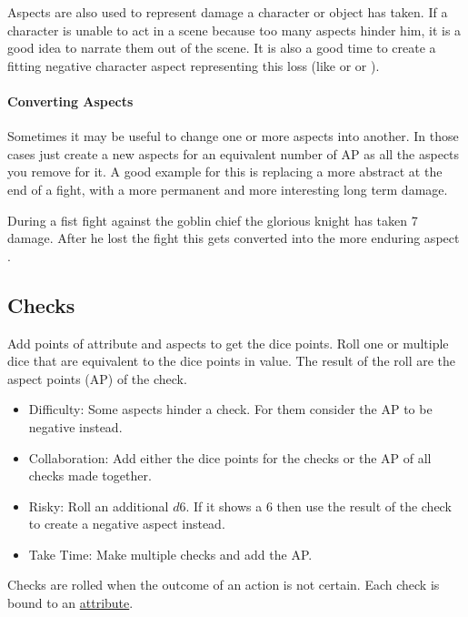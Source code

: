 \documentclass[11pt]{article}
\begin{document}
{Aspects are also used to represent damage a character or object has taken. If a character is unable to act in a scene because too many aspects hinder him, it is a good idea to narrate them out of the scene. It is also a good time to create a fitting negative character aspect representing this loss (like  or  or ).
\paragraph*{Converting Aspects}
\label{sec:org5ca254e}

Sometimes it may be useful to change one or more aspects into another. In those cases just create a new aspects for an equivalent number of AP as all the aspects you remove for it.
A good example for this is replacing a more abstract  at the end of a fight, with a more permanent and more interesting long term damage.

\begin{pwexample}
During a fist fight against the goblin chief the glorious knight has taken 7 damage. After he lost the fight this gets converted into the more enduring aspect . 
\end{pwexample}
\subsection{Checks}
\label{sec:org6abca6f}
\begin{short}
Add points of attribute and aspects to get the dice points. Roll one or multiple dice that are equivalent to the dice points in value. The result of the roll are the aspect points (AP) of the check.
\begin{itemize}
\item Difficulty: Some aspects hinder a check. For them consider the AP to be negative instead.
\item Collaboration: Add either the dice points for the checks or the AP of all checks made together.
\item Risky: Roll an additional \(d6\). If it shows a \(6\) then use the result of the check to create a negative aspect instead.
\item Take Time: Make multiple checks and add the AP.
\end{itemize}
\end{short}

Checks are rolled when the outcome of an action is not certain. Each check is bound to an \hyperref[sec:org342499f]{attribute}.

}
\end{document}
